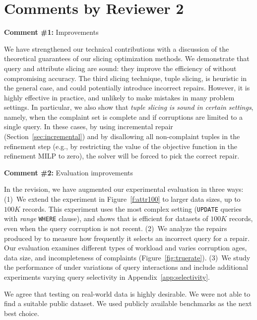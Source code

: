 
\section*{Comments by Reviewer 2}

\noindent
\textbf{Comment \#1:} Improvements
\begin{quote}
\end{quote}

We have strengthened our technical contributions with a discussion of the
theoretical guarantees of our slicing optimization methods. We demonstrate
that query and attribute slicing are sound: they improve the efficiency of
\sys without compromising accuracy. The third slicing technique, tuple
slicing, is heuristic in the general case, and could potentially introduce
incorrect repairs. However, it is highly effective in practice, and unlikely
to make mistakes in many problem settings. In particular, we also show that
\emph{tuple slicing is sound in certain settings}, namely, when the complaint
set is complete and if corruptions are limited to a single query. In these
cases, by using incremental repair (Section~\ref{sec:incremental}) and by
disallowing all non-complaint tuples in the refinement step (e.g., by
restricting the value of the objective function in the refinement MILP to
zero), the solver will be forced to pick the correct repair.


\comskip

\noindent
\textbf{Comment \#2:} Evaluation improvements
\begin{quote}
\end{quote}

In the revision, we have augmented our experimental evaluation in three ways:
(1)~We extend the experiment in Figure~\ref{f:attr100} to larger data sizes,
up to $100K$ records. This experiment uses the most complex setting
(\texttt{UPDATE} queries with \textit{range} \texttt{WHERE} clause), and shows
that \sys is efficient for datasets of $100K$ records, even when the query
corruption is not recent.
(2)~We analyze the repairs produced by \sys to measure how frequently it
selects an incorrect query for a repair. Our evaluation examines different
types of workload and varies corruption ages, data size, and incompleteness of
complaints (Figure~\ref{fig:truerate}).
(3)~We study the performance of \sys under variations of query interactions
and include additional experiments varying query selectivity in
Appendix~\ref{app:selectivity}. 

We agree that testing \sys on real-world data is highly desirable. We were not
able to find a suitable public dataset. We used publicly available benchmarks
as the next best choice.
